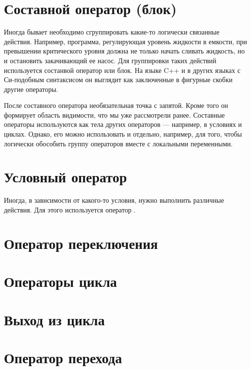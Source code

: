 \documentclass[book.tex]{subfiles}
\begin{document}



\maketitle 

\section*{Составной оператор (блок)}

Иногда бывает необходимо сгруппировать какие-то логически связанные действия. Например, программа, регулирующая уровень жидкости в емкости, при превышении критического уровня должна не только начать сливать жидкость, но и остановить закачивающий ее насос. Для группировки таких действий используется состанвой оператор или блок. На языке C++ и в других языках с Си-подобным синтаксисом он выглядит как заключенные в фигурные скобки \cppword{\{\}} другие операторы.

После составного оператора необязательная точка с запятой. Кроме того он формирует область видимости, что мы уже рассмотрели ранее. Составные операторы используются как тела других операторов --- например, в условиях и циклах. Однако, его можно использовать и отдельно, например, для того, чтобы логически обособить группу операторов вместе с локальными переменными.

\section*{Условный оператор}

Иногда, в зависимости от какого-то условия, нужно выполнить различные действия. Для этого используется оператор .

\section*{Оператор переключения}

\section*{Операторы цикла}

\section*{Выход из цикла}

\section*{Оператор перехода}
\end{document}
